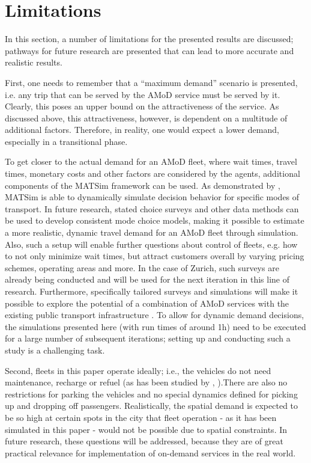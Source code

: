 \section{Limitations}
\label{sec:discussion}

In this section, a number of limitations for the presented results are discussed; pathways for future research are presented that can lead to more accurate and realistic results.


First, one needs to remember that a ``maximum demand'' scenario is presented, i.e. any trip that can be served by the AMoD service must be served by it. Clearly, this poses an upper bound on the attractiveness of the service. As discussed above, this attractiveness, however, is dependent on a multitude of additional factors. Therefore, in reality, one would expect a lower demand, especially in a transitional phase.


To get closer to the actual demand for an AMoD fleet, where wait times, travel times, monetary costs and other factors are considered by the agents, additional components of the MATSim framework can be used. As demonstrated by \citet{horl_abmtrans17}, MATSim is able to dynamically simulate decision behavior for specific modes of transport. In future research, stated choice surveys and other data methods can be used to develop consistent mode choice models, making it possible to estimate a more realistic, dynamic travel demand for an AMoD fleet through simulation. Also, such a setup will enable further questions about control of fleets, e.g. how to not only minimize wait times, but attract customers overall by varying pricing schemes, operating areas and more.  In the case of Zurich, such surveys are already being conducted \citep{Becker2017} and will be used for the next iteration in this line of research. Furthermore, specifically tailored surveys and simulations will make it possible to explore the potential of a combination of AMoD services with the existing public transport infrastructure \citep{SHEN2018125, WANG2018797, trainPaper}. To allow for dynamic demand decisions, the simulations presented here (with run times of around 1h) need to be executed for a large number of subsequent iterations; setting up and conducting such a study is a challenging task.


Second, fleets in this paper operate ideally; i.e., the vehicles do not need maintenance, recharge or refuel (as has been studied by  \citet{LOEB2018222}, \citet{CHEN2016243}).There are also no restrictions for parking the vehicles and no special dynamics defined for picking up and dropping off passengers. Realistically, the spatial demand is expected to be so high at certain spots in the city that fleet operation - as it has been simulated in this paper - would not be possible due to spatial constraints. In future research, these questions will be addressed, because they are of great practical relevance for implementation of on-demand services in the real world.


